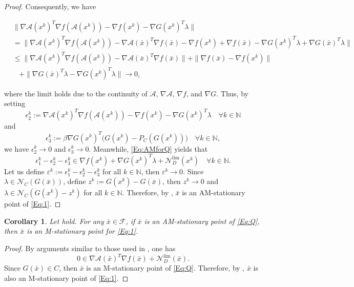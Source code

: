 \documentclass[11pt,a4paper,reqno]{amsart}
\newtheorem{corollary}[theorem]{Corollary}
\begin{document}
{\begin{proof}
Consequently, we have
\begin{small}
\begin{equation*}
    \begin{aligned}
       & \|\nabla \mathcal A (x^k)^T \nabla f(\mathcal A(x^k))-\nabla f(x^k)-\nabla G(x^k)^T\lambda \|\\
       & = \|\nabla \mathcal A (x^k)^T \nabla f(\mathcal A(x^k))-\nabla \mathcal A (\bar x)^T \nabla f(\bar x) - \nabla f(x^k) + \nabla f(\bar x)  - \nabla G(x^k)^T\lambda + \nabla G(\bar x)^T\lambda \|\\
       & \leq  \|\nabla \mathcal A (x^k)^T \nabla f(\mathcal A(x^k))-\nabla \mathcal A (\bar x)^T \nabla f(\bar x)\| + \|\nabla f(\bar x)- \nabla f(x^k) \| \\
       & ~~~~ +\| \nabla G(\bar x)^T\lambda - \nabla G(x^k)^T\lambda \|\to 0,
    \end{aligned}
\end{equation*}
\end{small}
where the limit holds due to the continuity of $\mathcal A$, $\nabla \mathcal A$, $\nabla f$, and $\nabla G$. Thus, by setting
\begin{equation*}
 \epsilon_2^k:=\nabla \mathcal A (x^k)^T \nabla f(\mathcal A(x^k))-\nabla f(x^k)-\nabla G(x^k)^T\lambda \quad \forall k\in \mathbb N
\end{equation*}
and
\begin{equation}\label{Eq:result2approx}
    \epsilon_3^k:=\beta \nabla G(x^k)^T\big(G(x^k)-P_C(G(x^k))\big) \quad \forall k\in \mathbb N,
\end{equation}
we have $\epsilon_2^k \to 0$ and $\epsilon_3^k \to 0$. Meanwhile,
\eqref{Eq:AMforQ} yields that
\begin{equation*}
    \epsilon_1^k-\epsilon_2^k-\epsilon_3^k \in \nabla f(x^k)+ \nabla G(x^k)^T\lambda + \mathcal N_D^{\text{lim}}(x^k) \quad \forall k\in \mathbb N. 
\end{equation*}
Let us define $\varepsilon^k:=\epsilon_1^k-\epsilon_2^k-\epsilon_3^k$ for all $k\in \mathbb N$, then $\varepsilon^k\to 0$. Since $\lambda \in \mathcal N_C(G(\bar x))$, define $z^k := G(x^k)- G(\bar x)$, then $z^k \to 0$ and $\lambda \in \mathcal N_C(G(x^k)-z^k)$ for all $k\in \mathbb N$. Therefore, by , $\bar x$ is an AM-stationary point of \eqref{Eq:1}.
\end{proof}
  
\begin{corollary}\label{Th:PtoQ}
      Let  hold. For any $\bar x \in \mathcal F$, if $\bar x$ is an AM-stationary point of \eqref{Eq:Q}, then $\bar x$ is an M-stationary point for \eqref{Eq:1}.
\end{corollary}
\begin{proof}
   By arguments similar to those used in , one has
\begin{equation*}
    0\in \nabla \mathcal A(\bar x)^T \nabla f(\bar x)+\mathcal N_D^{\text{lim}}(\bar x).
\end{equation*}
Since $G(\bar x)\in C$, then $\bar x$ is an M-stationary point of \eqref{Eq:Q}. Therefore, by , $\bar x$ is also an M-stationary point of \eqref{Eq:1}.
\end{proof}

}
\end{document}
